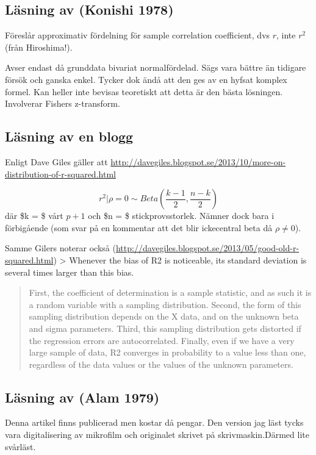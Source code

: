 \documentclass[]{article}
\begin{document}
\subsection{Läsning av (Konishi 1978)}\label{lasning-av-konishi1978}

Föreslår approximativ fördelning för sample correlation coefficient, dvs
\(r\), inte \(r^2\) (från Hiroshima!).

Avser endast då grunddata bivariat normalfördelad. Sägs vara bättre än
tidigare försök och ganska enkel. Tycker dok ändå att den ges av en
hyfsat komplex formel. Kan heller inte bevisas teoretiskt att detta är
den bästa lösningen. Involverar Fishers z-transform.

\subsection{Läsning av en blogg}\label{lasning-av-en-blogg}

Enligt Dave Giles gäller att
\url{http://davegiles.blogspot.se/2013/10/more-on-distribution-of-r-squared.html}

\[r^2|\rho = 0 \sim Beta(\frac{k-1}{2}, \frac{n-k}{2})\] där \$k = \$
vårt \(p+1\) och \$n = \$ stickprovsstorlek. Nämner dock bara i
förbigående (som svar på en kommentar att det blir ickecentral beta då
\(\rho \neq 0\)).

Samme Gilers noterar också
(\url{http://davegiles.blogspot.se/2013/05/good-old-r-squared.html})
\textgreater{} Whenever the bias of R2 is noticeable, its standard
deviation is several times larger than this bias.

\begin{quote}
First, the coefficient of determination is a sample statistic, and as
such it is a random variable with a sampling distribution. Second, the
form of this sampling distribution depends on the X data, and on the
unknown beta and sigma parameters. Third, this sampling distribution
gets distorted if the regression errors are autocorrelated. Finally,
even if we have a very large sample of data, R2 converges in probability
to a value less than one, regardless of the data values or the values of
the unknown parameters.
\end{quote}

\subsection{Läsning av (Alam 1979)}\label{lasning-av-alam1979}

Denna artikel finns publicerad men kostar då pengar. Den version jag
läst tycks vara digitalisering av mikrofilm och originalet skrivet på
skrivmaskin.Därmed lite svårläst.
\end{document}
